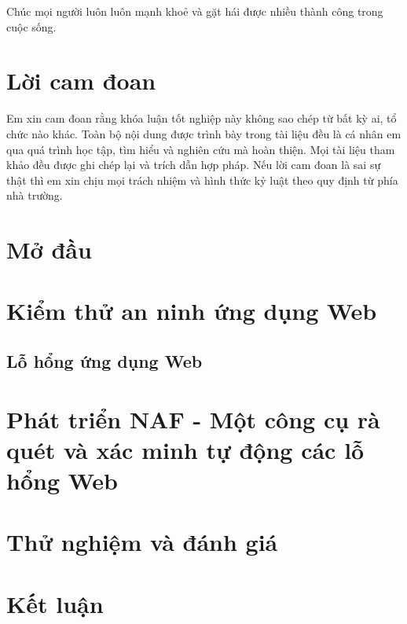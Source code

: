 \documentclass[12pt,a4paper]{report}
\begin{document}
Chúc mọi người luôn luôn mạnh khoẻ và gặt hái được nhiều thành công trong cuộc sống.

\chapter*{Lời cam đoan}

Em xin cam đoan rằng khóa luận tốt nghiệp này không sao chép từ bất kỳ ai,
tổ chức nào khác. Toàn bộ nội dung được trình bày trong tài liệu đều là cá nhân em qua quá
trình học tập, tìm hiểu và nghiên cứu mà hoàn thiện. Mọi tài liệu tham khảo đều được ghi chép
lại và trích dẫn hợp pháp. Nếu lời cam đoan là sai sự thật thì em xin chịu mọi trách nhiệm và
hình thức kỷ luật theo quy định từ phía nhà trường.

\tableofcontents{}
\clearpage{}

\listoffigures{}

\listoftables{}

\lstlistoflistings

\chapter{Mở đầu}



\chapter{Kiểm thử an ninh ứng dụng Web}

\section{Lỗ hổng ứng dụng Web}


\chapter{Phát triển NAF - Một công cụ rà quét và xác minh tự động các lỗ hổng Web}


\chapter{Thử nghiệm và đánh giá}


\chapter{Kết luận}



\nocite{*}
\printbibliography[heading=bibintoc, title=Tài liệu tham khảo]

\end{document}
